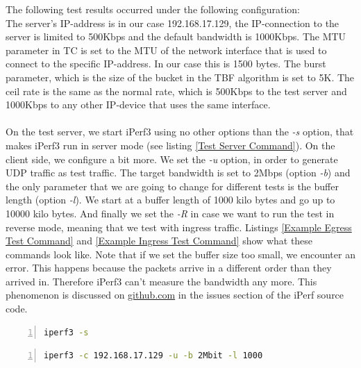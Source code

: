 The following test results occurred under the following configuration:
\\
The server's \acs{IP}-address is in our case 192.168.17.129, the \acs{IP}-connection to the server is limited to 500Kbps and the default bandwidth is 1000Kbps. The \ac{MTU} parameter in \acs{TC} is set to the \acs{MTU} of the network interface that is used to connect to the specific \acs{IP}-address. In our case this is 1500 bytes. The burst parameter, which is the size of the bucket in the \acs{TBF} algorithm is set to 5K. The ceil rate is the same as the normal rate, which is 500Kbps to the test server and 1000Kbps to any other \acs{IP}-device that uses the same interface.
\\
\\
On the test server, we start iPerf3 using no other options than the \textit{-s} option, that makes iPerf3 run in server mode (see listing \ref{Test Server Command}). On the client side, we configure a bit more. We set the \textit{-u} option, in order to generate \acs{UDP} traffic as test traffic. The target bandwidth is set to 2Mbps (option \textit{-b}) and the only parameter that we are going to change for different tests is the buffer length (option \textit{-l}). We start at a buffer length of 1000 kilo bytes and go up to 10000 kilo bytes. And finally we set the \textit{-R} in case we want to run the test in reverse mode, meaning that we test with ingress traffic. Listings \ref{Example Egress Test Command} and \ref{Example Ingress Test Command} show what these commands look like. Note that if we set the buffer size too small, we encounter an error. This happens because the packets arrive in a different order than they arrived in. Therefore iPerf3 can't measure the bandwidth any more. This phenomenon is discussed on \href{https://github.com/esnet/iperf/issues/457}{github.com}\cite{mah2016iperfIssue} in the issues section of the iPerf source code.

\begin{lstlisting}[language=sh, caption = Test Server Command, captionpos=b, numbers=left, frame=single, breaklines=true, breakatwhitespace=true, showstringspaces=false, label=Test Server Command]
iperf3 -s
\end{lstlisting}
\newpage
\begin{lstlisting}[language=sh, caption = Example Egress Test Command, captionpos=b, numbers=left, frame=single, breaklines=true, breakatwhitespace=true, showstringspaces=false, label=Example Egress Test Command]
iperf3 -c 192.168.17.129 -u -b 2Mbit -l 1000
\end{lstlisting}

